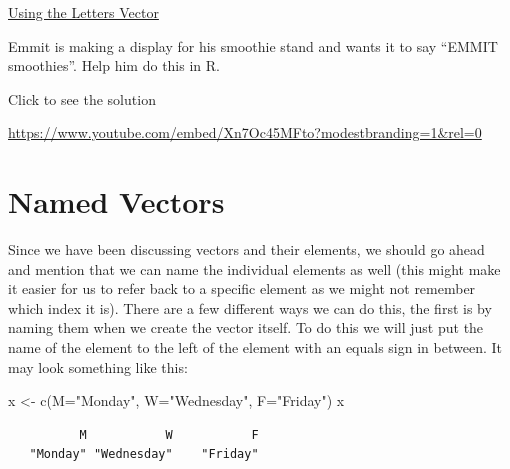 \documentclass[
  letterpaper,
  DIV=11,
  numbers=noendperiod]{scrreprt}
\newenvironment{Shaded}{\begin{snugshade}}{\end{snugshade}}
\newcommand{\AttributeTok}[1]{\textcolor[rgb]{0.40,0.45,0.13}{#1}}
\newcommand{\FunctionTok}[1]{\textcolor[rgb]{0.28,0.35,0.67}{#1}}
\newcommand{\NormalTok}[1]{\textcolor[rgb]{0.00,0.23,0.31}{#1}}
\newcommand{\OtherTok}[1]{\textcolor[rgb]{0.00,0.23,0.31}{#1}}
\newcommand{\StringTok}[1]{\textcolor[rgb]{0.13,0.47,0.30}{#1}}
\begin{document}
\begin{watch}{}{}
    \href{https://youtu.be/H-q_LZVM0_0}{Using the Letters Vector}
\end{watch}

\begin{tcolorbox}[enhanced jigsaw, colframe=quarto-callout-tip-color-frame, colback=white, breakable, rightrule=.15mm, title=\textcolor{quarto-callout-tip-color}{\faLightbulb}\hspace{0.5em}{Try it Out}, bottomtitle=1mm, toptitle=1mm, titlerule=0mm, left=2mm, coltitle=black, colbacktitle=quarto-callout-tip-color!10!white, leftrule=.75mm, opacitybacktitle=0.6, bottomrule=.15mm, opacityback=0, arc=.35mm, toprule=.15mm]

Emmit is making a display for his smoothie stand and wants it to say
``EMMIT smoothies''. Help him do this in R.

Click to see the solution

\url{https://www.youtube.com/embed/Xn7Oc45MFto?modestbranding=1&rel=0}

\end{tcolorbox}

\section{Named Vectors}\label{named-vectors}

Since we have been discussing vectors and their elements, we should go
ahead and mention that we can name the individual elements as well (this
might make it easier for us to refer back to a specific element as we
might not remember which index it is). There are a few different ways we
can do this, the first is by naming them when we create the vector
itself. To do this we will just put the name of the element to the left
of the element with an equals sign in between. It may look something
like this:

\begin{Shaded}
\begin{Highlighting}[]
\NormalTok{x }\OtherTok{\textless{}{-}} \FunctionTok{c}\NormalTok{(}\AttributeTok{M=}\StringTok{"Monday"}\NormalTok{, }\AttributeTok{W=}\StringTok{"Wednesday"}\NormalTok{, }\AttributeTok{F=}\StringTok{"Friday"}\NormalTok{)}
\NormalTok{x}
\end{Highlighting}
\end{Shaded}

\begin{verbatim}
          M           W           F 
   "Monday" "Wednesday"    "Friday" 
\end{verbatim}
\end{document}
